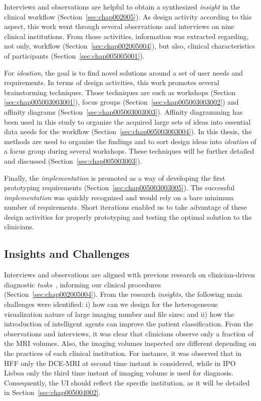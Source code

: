 Interviews and observations are helpful to obtain a synthesized {\it insight} in the clinical workflow (Section~\ref{sec:chap002005}).
As design activity according to this aspect, this work went through several observations and interviews on nine clinical institutions.
From those activities, information was extracted regarding, not only, workflow (Section~\ref{sec:chap002005004}), but also, clinical characteristics of participants (Section~\ref{sec:chap005005001}).

For {\it ideation}, the goal is to find novel solutions around a set of user needs and requirements.
In terms of design activities, this work promotes several brainstorming techniques.
Those techniques are such as workshops (Section \ref{sec:chap005003003001}), focus groups (Section~\ref{sec:chap005003003002}) and affinity diagrams (Section~\ref{sec:chap005003003003}).
Affinity diagramming has been used in this study to organize the acquired large sets of ideas into essential data needs for the workflow (Section~\ref{sec:chap005003003004}).
In this thesis, the methods are used to organize the findings and to sort design ideas into {\it ideation} of a focus group during several workshops.
These techniques will be further detailed and discussed (Section~\ref{sec:chap005003003}).

Finally, the {\it implementation} is promoted as a way of developing the first prototyping requirements (Section~\ref{sec:chap005003003005}).
The successful {\it implementation} was quickly recognized and would rely on a bare minimum number of requirements.
Short iterations enabled us to take advantage of these design activities for properly prototyping and testing the optimal solution to the clinicians.

\subsection{Insights and Challenges}
\label{sec:chap005003002}

Interviews and observations are aligned with previous research on clinician-driven diagnostic {\it tasks}~\cite{rosset2004osirix, wolf2005medical, Sultanum:2018:MTP:3173574.3173996, weese2016four, heinrich2012mind}, informing our clinical procedures (Section~\ref{sec:chap002005004}).
From the research {\it insights}, the following main challenges were identified:
i) how can we design for the heterogeneous visualization nature of large imaging number and file sizes; and
ii) how the introduction of intelligent agents can improve the patient classification.
From the  observations and interviews, it was clear that clinicians observe only a fraction of the \ac{MRI} volumes.
Also, the imaging volumes inspected are different depending on the practices of each clinical institution.
For instance, it was observed that in \ac{HFF} only the \ac{DCE}-\ac{MRI} at second time instant is considered, while in IPO Lisboa only the third time instant of imaging volume is used for diagnosis.
Consequently, the \ac{UI} should reflect the specific institution, as it will be detailed in Section~\ref{sec:chap005004002}.

